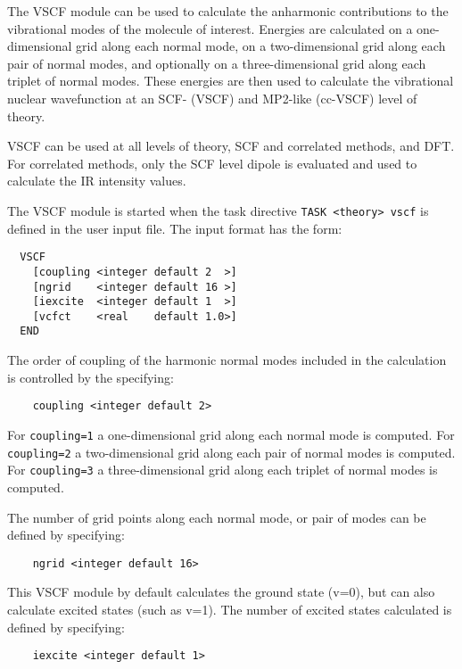 %
%
\label{sec:vscf}

The VSCF module can be used to calculate the anharmonic contributions to the 
vibrational modes of the molecule of interest. Energies are calculated on a 
one-dimensional grid along each normal mode, on a two-dimensional grid along
each pair of normal modes, and optionally on a three-dimensional grid along
each triplet of normal modes. These energies are then used to calculate the
vibrational nuclear wavefunction at an SCF- (VSCF) and MP2-like (cc-VSCF) level
of theory. 

VSCF can be used at all levels of theory, SCF and correlated methods, and DFT.  
For correlated methods, only the SCF level dipole is evaluated and used to 
calculate the IR intensity values. 

The VSCF module is started when the task directive
\verb+TASK <theory> vscf+ is defined in the user input file. The input 
format has the form:

\begin{verbatim}
  VSCF
    [coupling <integer default 2  >]
    [ngrid    <integer default 16 >]
    [iexcite  <integer default 1  >]
    [vcfct    <real    default 1.0>]
  END
\end{verbatim}

The order of coupling of the harmonic normal modes included in the calculation
is controlled by the specifying:

\begin{verbatim}
    coupling <integer default 2>
\end{verbatim}

For \verb+coupling=1+ a one-dimensional grid along each normal mode is computed.
For \verb+coupling=2+ a two-dimensional grid along each pair of normal modes is computed.
For \verb+coupling=3+ a three-dimensional grid along each triplet of normal modes is computed.

The number of grid points along each normal mode, or pair of modes can be defined 
by specifying:

\begin{verbatim}
    ngrid <integer default 16>
\end{verbatim}

This VSCF module by default calculates the ground state (v=0), but can also calculate excited
states (such as v=1). The number of excited states calculated is defined by specifying:

\begin{verbatim}
    iexcite <integer default 1>
\end{verbatim}

